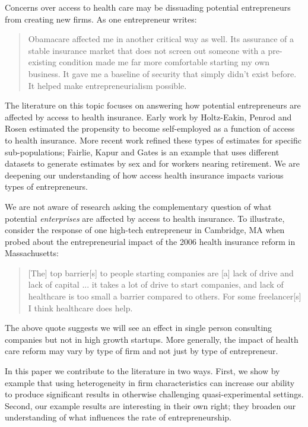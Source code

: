 \documentclass[12pt]{article}
\begin{document}
Concerns over access to health care may be dissuading potential entrepreneurs from creating new firms. As one entrepreneur writes:
\begin{quote}
Obamacare affected me in another critical way as well. Its assurance of a stable insurance market that does not screen out someone with a pre-existing condition made me far more comfortable starting my own business. It gave me a baseline of security that simply didn't exist before. It helped make entrepreneurialism possible. \cite{sullivan}
\end{quote}

The literature on this topic focuses on answering how potential entrepreneurs are affected by access to health insurance. Early work by Holtz-Eakin, Penrod and Rosen \cite{holtz_health}  estimated the propensity to become self-employed as a function of access to health insurance. More recent work refined these types of estimates for specific sub-populations; Fairlie, Kapur and Gates \cite{fairlie_health} is an example that uses different datasets to generate estimates by sex and for workers nearing retirement. We are deepening our understanding of how access health insurance impacts various types of entrepreneurs. 

We are not aware of research asking the complementary question of what potential \emph{enterprises} are affected by access to health insurance. To illustrate, consider the response of one high-tech entrepreneur in Cambridge, MA when probed about the entrepreneurial impact of the 2006 health insurance reform in Massachusetts:
\begin{quote}
[The] top barrier[s] to people starting companies are [a] lack of drive and lack of capital ... it takes a lot of drive to start companies, and lack of healthcare is too small a barrier compared to others. For some freelancer[s] I think healthcare does help.
\end{quote}
The above quote suggests we will see an effect in single person consulting companies but not in high growth startups. More generally, the impact of health care reform may vary by type of firm and not just by type of entrepreneur. 

In this paper we contribute to the literature in two ways. First, we show by example that using heterogeneity in firm characteristics can increase our ability to produce significant results in otherwise challenging quasi-experimental settings. Second, our example results are interesting in their own right; they broaden our understanding of what influences the rate of entrepreneurship. 
\end{document}
